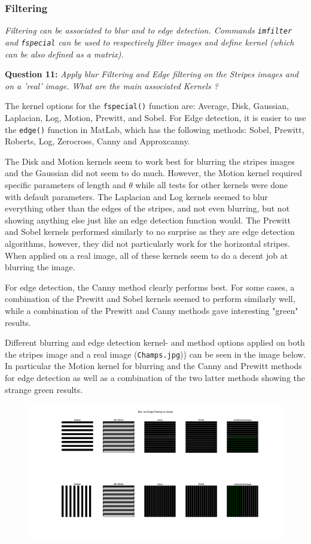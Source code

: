 \subsubsection{Filtering}
\textit{Filtering can be associated to blur and to edge detection. Commands \texttt{imfilter} and \texttt{fspecial} can be used to respectively ﬁlter images and deﬁne kernel (which can be also deﬁned as a matrix).}


\textbf{Question 11:}
\textit{Apply blur Filtering and Edge ﬁltering on the Stripes images and on a ’real’ image. What are the main associated Kernels ?}

The kernel options for the \texttt{fspecial()} function are:
Average, Disk, Gaussian, Laplacian, Log, Motion, Prewitt, and Sobel. For Edge detection, it is easier to use the \texttt{edge()} function in MatLab, which has the following methods: Sobel, Prewitt, Roberts, Log, Zerocross, Canny and Approxcanny.

The Disk and Motion kernels seem to work best for blurring the stripes images and the Gaussian did not seem to do much. However, the Motion kernel required specific parameters of length and $\theta$ while all tests for other kernels were done with default parameters. The Laplacian and Log kernels seemed to blur everything other than the edges of the stripes, and not even blurring, but not showing anything else just like an edge detection function would. 
The Prewitt and Sobel kernels performed similarly to no surprise as they are edge detection algorithms, however, they did not particularly work for the horizontal stripes.
When applied on a real image, all of these kernels seem to do a decent job at blurring the image. 

For edge detection, the Canny method clearly performs best. For some cases, a combination of the Prewitt and Sobel kernels seemed to perform similarly well, while a combination of the Prewitt and Canny methods gave interesting "green" results.

Different blurring and edge detection kernel- and method options applied on both the stripes image and a real image (\texttt{Champs.jpg})) can be seen in the image below. In particular the Motion kernel for blurring and the Canny and Prewitt methods for edge detection as well as a combination of the two latter methods showing the strange green results.


\begin{figure}[H]
    \centering
    \includegraphics[width=\linewidth]{Doc/Graphics/Part1/Q11a.png}
\end{figure}


